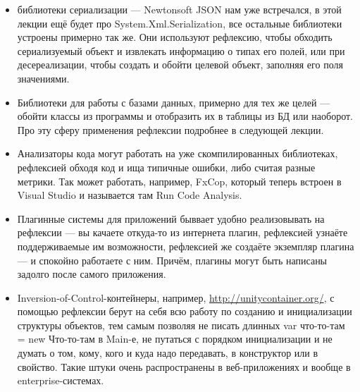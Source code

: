 \documentclass[a5paper]{article}
\begin{document}
\begin{itemize}
    \item библиотеки сериализации --- Newtonsoft JSON нам уже встречался, в этой лекции ещё будет про System.Xml.Serialization, все остальные библиотеки устроены примерно так же. Они используют рефлексию, чтобы обходить сериализуемый объект и извлекать информацию о типах его полей, или при десереализации, чтобы создать и обойти целевой объект, заполняя его поля значениями.
    \item Библиотеки для работы с базами данных, примерно для тех же целей --- обойти классы из программы и отобразить их в таблицы из БД или наоборот. Про эту сферу применения рефлексии подробнее в следующей лекции.
    \item Анализаторы кода могут работать на уже скомпилированных библиотеках, рефлексией обходя код и ища типичные ошибки, либо считая разные метрики. Так может работать, например, FxCop, который теперь встроен в Visual Studio и называется там Run Code Analysis.
    \item Плагинные системы для приложений быввает удобно реализовывать на рефлексии --- вы качаете откуда-то из интернета плагин, рефлексией узнаёте поддерживаемые им возможности, рефлексией же создаёте экземпляр плагина --- и спокойно работаете с ним. Причём, плагины могут быть написаны задолго после самого приложения.
    \item Inversion-of-Control-контейнеры, например, \url{http://unitycontainer.org/}, с помощью рефлексии берут на себя всю работу по созданию и инициализации структуры объектов, тем самым позволяя не писать длинных var что-то-там = new Что-то-там в Main-е, не путаться с порядком инициализации и не думать о том, кому, кого и куда надо передавать, в конструктор или в свойство. Такие штуки очень распространены в веб-приложениях и вообще в enterprise-системах.
\end{itemize}
\end{document}
